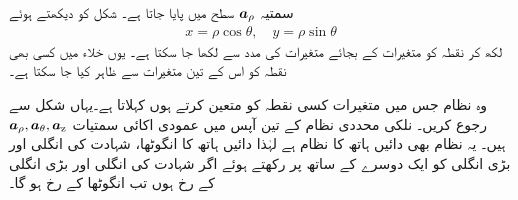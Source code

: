 سمتیہ ${\boldsymbol{a}}_{\rho}$ سطح  میں پایا جاتا ہے۔ شکل  کو دیکھتے ہوئے
\begin{align*}
x=\rho \cos \theta,\quad y=\rho \sin \theta
\end{align*}
لکھ کر نقطہ  کو متغیرات  کے بجائے متغیرات  کی مدد سے  لکھا جا سکتا ہے۔ یوں خلاء میں کسی بھی نقطہ کو اس کے تین متغیرات  سے ظاہر کیا جا سکتا ہے۔

وہ نظام جس میں متغیرات   کسی نقطہ کو متعین کرتے  ہوں   کہلاتا ہے۔یہاں شکل   سے رجوع کریں۔ نلکی محددی نظام کے تین آپس میں عمودی  اکائی سمتیات ${\boldsymbol{a}}_{\rho},{\boldsymbol{a}}_{\theta},{\boldsymbol{a}}_{\textup{z}}$ ہیں۔ یہ نظام بھی دائیں ہاتھ کا نظام ہے لہٰذا دائیں ہاتھ کا انگوٹھا، شہادت کی انگلی اور  بڑی انگلی کو ایک دوسرے کے ساتھ  پر رکھتے ہوئے اگر  شہادت کی انگلی  اور بڑی انگلی  کے رخ ہوں تب انگوٹھا  کے رخ ہو گا۔ 

